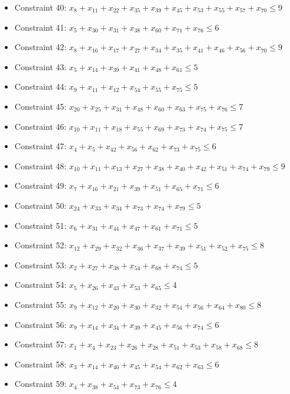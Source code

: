 \documentclass[11pt]{article}
\begin{document}
\begin{itemize}
\item Constraint 40: $x_{8} + x_{11} + x_{22} + x_{35} + x_{39} + x_{45} + x_{53} + x_{55} + x_{57} + x_{70} \le 9$
\item Constraint 41: $x_{5} + x_{30} + x_{31} + x_{38} + x_{60} + x_{71} + x_{76} \le 6$
\item Constraint 42: $x_{8} + x_{16} + x_{17} + x_{27} + x_{34} + x_{35} + x_{41} + x_{46} + x_{56} + x_{70} \le 9$
\item Constraint 43: $x_{5} + x_{14} + x_{39} + x_{41} + x_{48} + x_{61} \le 5$
\item Constraint 44: $x_{9} + x_{11} + x_{12} + x_{54} + x_{55} + x_{75} \le 5$
\item Constraint 45: $x_{20} + x_{25} + x_{31} + x_{48} + x_{60} + x_{63} + x_{75} + x_{76} \le 7$
\item Constraint 46: $x_{10} + x_{11} + x_{18} + x_{55} + x_{69} + x_{73} + x_{74} + x_{75} \le 7$
\item Constraint 47: $x_{4} + x_{5} + x_{42} + x_{56} + x_{62} + x_{73} + x_{75} \le 6$
\item Constraint 48: $x_{10} + x_{11} + x_{13} + x_{27} + x_{38} + x_{40} + x_{42} + x_{51} + x_{74} + x_{79} \le 9$
\item Constraint 49: $x_{7} + x_{16} + x_{21} + x_{39} + x_{51} + x_{65} + x_{71} \le 6$
\item Constraint 50: $x_{24} + x_{33} + x_{34} + x_{73} + x_{74} + x_{79} \le 5$
\item Constraint 51: $x_{6} + x_{31} + x_{44} + x_{47} + x_{61} + x_{71} \le 5$
\item Constraint 52: $x_{12} + x_{29} + x_{32} + x_{36} + x_{37} + x_{39} + x_{51} + x_{52} + x_{75} \le 8$
\item Constraint 53: $x_{2} + x_{27} + x_{38} + x_{54} + x_{68} + x_{74} \le 5$
\item Constraint 54: $x_{5} + x_{26} + x_{43} + x_{53} + x_{65} \le 4$
\item Constraint 55: $x_{9} + x_{12} + x_{20} + x_{30} + x_{32} + x_{54} + x_{56} + x_{64} + x_{80} \le 8$
\item Constraint 56: $x_{9} + x_{14} + x_{34} + x_{39} + x_{45} + x_{56} + x_{74} \le 6$
\item Constraint 57: $x_{1} + x_{4} + x_{23} + x_{26} + x_{28} + x_{51} + x_{53} + x_{58} + x_{68} \le 8$
\item Constraint 58: $x_{3} + x_{14} + x_{40} + x_{45} + x_{54} + x_{62} + x_{63} \le 6$
\item Constraint 59: $x_{4} + x_{38} + x_{54} + x_{73} + x_{76} \le 4$

\end{itemize}
\end{document}
